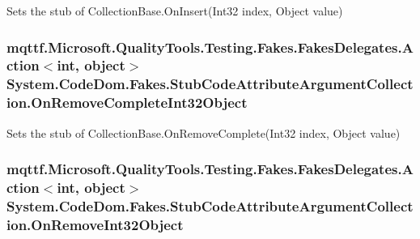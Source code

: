 Sets the stub of Collection\-Base.\-On\-Insert(\-Int32 index, Object value)

\hypertarget{class_system_1_1_code_dom_1_1_fakes_1_1_stub_code_attribute_argument_collection_a7062c91291e561eb68c164c05f4b87ff}{
\subsubsection[{On\-Remove\-Complete\-Int32\-Object}]{\setlength{\rightskip}{0pt plus 5cm}mqttf.\-Microsoft.\-Quality\-Tools.\-Testing.\-Fakes.\-Fakes\-Delegates.\-Action$<$int, object$>$ System.\-Code\-Dom.\-Fakes.\-Stub\-Code\-Attribute\-Argument\-Collection.\-On\-Remove\-Complete\-Int32\-Object}}\label{class_system_1_1_code_dom_1_1_fakes_1_1_stub_code_attribute_argument_collection_a7062c91291e561eb68c164c05f4b87ff}


Sets the stub of Collection\-Base.\-On\-Remove\-Complete(\-Int32 index, Object value)

\hypertarget{class_system_1_1_code_dom_1_1_fakes_1_1_stub_code_attribute_argument_collection_ad5e7df5234100665679bc0db79d6a23f}{
\subsubsection[{On\-Remove\-Int32\-Object}]{\setlength{\rightskip}{0pt plus 5cm}mqttf.\-Microsoft.\-Quality\-Tools.\-Testing.\-Fakes.\-Fakes\-Delegates.\-Action$<$int, object$>$ System.\-Code\-Dom.\-Fakes.\-Stub\-Code\-Attribute\-Argument\-Collection.\-On\-Remove\-Int32\-Object}}\label{class_system_1_1_code_dom_1_1_fakes_1_1_stub_code_attribute_argument_collection_ad5e7df5234100665679bc0db79d6a23f}


